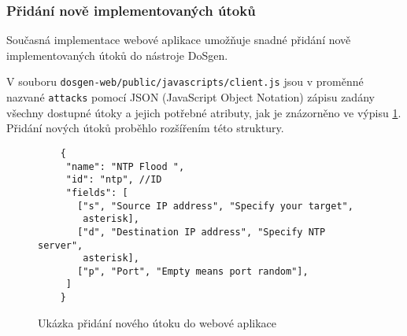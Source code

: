 \subsubsection{Přidání nově implementovaných útoků}
Současná implementace webové aplikace umožňuje snadné přidání nově implementovaných útoků do nástroje DoSgen.

V souboru \texttt{dosgen-web/public/javascripts/client.js} jsou v proměnné nazvané \texttt{attacks} pomocí JSON (JavaScript Object Notation) zápisu zadány všechny dostupné útoky a jejich potřebné atributy, jak je znázorněno ve výpisu \ref{fig:dosgen-web-attack-json}. Přidání nových útoků proběhlo rozšířením této struktury.


\begin{figure} [ht]
	\centering
	\begin{lstlisting}
	{
     "name": "NTP Flood ",
     "id": "ntp", //ID
     "fields": [
       ["s", "Source IP address", "Specify your target",
        asterisk],
       ["d", "Destination IP address", "Specify NTP server",
        asterisk],
       ["p", "Port", "Empty means port random"],
     ]
	}	
	\end{lstlisting}
	\caption{Ukázka přidání nového útoku do webové aplikace}
	\label{fig:dosgen-web-attack-json}
\end{figure}

